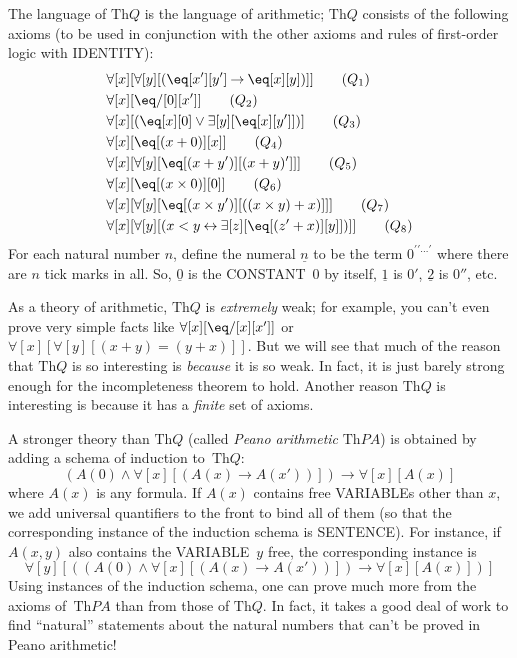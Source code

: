 \documentclass[10pt,a4paper]{article}
\newcommand*{\olup}[1]{\MakeUppercase{#1}}
\theoremstyle{plain}
\theoremstyle{definition}
\theoremstyle{remark}
\providecommand{\lif}{\mathbin{\rightarrow}}
\providecommand{\lforall}{\mathord{\forall}}
\providecommand{\lexists}{\mathord{\exists}}
\providecommand{\Obj}{}
\providecommand{\Th}{\ensuremath{\mathrm{Th}}}
\providecommand{\num}[1]{\underline{#1}}
\providecommand{\liff}{\mathbin{\leftrightarrow}}
\begin{document}
The language of $\Th{Q}$ is the language of
arithmetic; $\Th{Q}$ consists of the following axioms
(to be used in conjunction with the other axioms and rules of
first-order logic with \olup{identity}):
\begin{align*}
& \lforall[x][\lforall[y][(\eq[x'][y'] \lif \eq[x][y])]] \tag{$Q_1$}\\
& \lforall[x][\eq/[\Obj 0][x']] \tag{$Q_2$}\\
& \lforall[x][(\eq[x][\Obj 0] \lor \lexists[y][\eq[x][y']])] \tag{$Q_3$}\\
& \lforall[x][\eq[(x + \Obj 0)][x]] \tag{$Q_4$}\\
& \lforall[x][\lforall[y][\eq[(x + y')][(x + y)']]] \tag{$Q_5$}\\
& \lforall[x][\eq[(x \times \Obj 0)][\Obj 0]] \tag{$Q_6$}\\
& \lforall[x][\lforall[y][\eq[(x \times y')][((x \times y) + x)]]] \tag{$Q_7$}\\
& \lforall[x][\lforall[y][(x < y \liff \lexists[z][\eq[(z' + x)][y]])]] \tag{$Q_8$}
\end{align*}
For each natural number $n$, define the numeral $\num{n}$ to be the
term $\Obj{0}^{\prime\prime\ldots\prime}$ where there are $n$ tick marks in
all.  So, $\num{0}$ is the \olup{constant}~$\Obj{0}$ by itself, $\num{1}$
is $\Obj{0}'$, $\num{2}$ is $\Obj{0}''$, etc.

As a theory of arithmetic, $\Th{Q}$ is \emph{extremely} weak; for
example, you can't even prove very simple facts like
$\lforall[x][\eq/[x][x']]$ or $\lforall[x][\lforall[y][(x + y) = (y +
    x)]]$. But we will see that much of the reason that $\Th{Q}$ is so
interesting is \emph{because} it is so weak. In fact, it is just
barely strong enough for the incompleteness theorem to hold. Another
reason $\Th{Q}$ is interesting is because it has a \emph{finite} set
of axioms.

A stronger theory than $\Th{Q}$ (called \emph{Peano arithmetic} $\Th{PA}$)
is obtained by adding a schema of induction to~$\Th{Q}$:
\[
(A(\Obj 0) \land \lforall[x][(A(x) \lif A(x'))]) \lif \lforall[x][A(x)]
\]
where $A(x)$ is any formula. If $A(x)$ contains free \olup{variable}s
other than $x$, we add universal quantifiers to the front to bind all
of them (so that the corresponding instance of the induction schema is
\olup{sentence}). For instance, if $A(x, y)$ also contains the
\olup{variable}~$y$ free, the corresponding instance is
\[
\lforall[y][((A(\Obj 0) \land \lforall[x][(A(x) \lif A(x'))]) \lif
  \lforall[x][A(x)])]
\]
Using instances of the induction schema, one can prove much more from
the axioms of~$\Th{PA}$ than from those of $\Th{Q}$. In fact, it takes
a good deal of work to find ``natural'' statements about the natural
numbers that can't be proved in Peano arithmetic!{}
\end{document}
